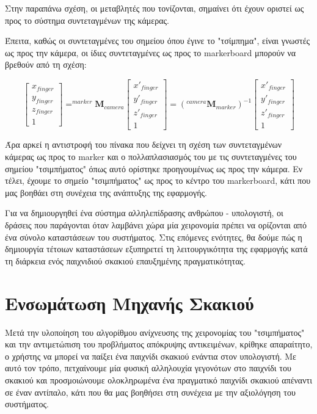 Στην παραπάνω σχέση, οι μεταβλητές που τονίζονται, σημαίνει ότι έχουν οριστεί ως προς το σύστημα συντεταγμένων της κάμερας.

Έπειτα, καθώς οι συντεταγμένες του σημείου όπου έγινε το "τσίμπημα", είναι γνωστές ως προς την κάμερα, οι ίδιες συντεταγμένες ως προς το markerboard μπορούν να βρεθούν από τη σχέση:


\begin{equation}
\begin{bmatrix}
x_{finger} \\ y_{finger} \\ z_{finger} \\ 1
\end{bmatrix}
=
^{marker}\mathbf{M}_{camera}
\begin{bmatrix}
x'_{finger} \\ y'_{finger} \\ z'_{finger} \\ 1
\end{bmatrix}
=
(^{camera}\mathbf{M}_{marker})^{-1}
\begin{bmatrix}
x'_{finger} \\ y'_{finger} \\ z'_{finger} \\ 1
\end{bmatrix}
\end{equation}


Άρα αρκεί η αντιστροφή του πίνακα που δείχνει τη σχέση των συντεταγμένων κάμερας ως προς το marker και ο πολλαπλασιασμός του με τις συντεταγμένες του σημείου "τσιμπήματος" όπως αυτό ορίστηκε προηγουμένως ως προς την κάμερα. Εν τέλει, έχουμε το σημείο "τσιμπήματος" ως προς το κέντρο του markerboard, κάτι που μας βοηθάει στη συνέχεια της ανάπτυξης της εφαρμογής.




Για να δημιουργηθεί ένα σύστημα αλληλεπίδρασης ανθρώπου - υπολογιστή, οι δράσεις που παράγονται όταν λαμβάνει χώρα μία χειρονομία πρέπει να ορίζονται από ένα σύνολο καταστάσεων του συστήματος. Στις επόμενες ενότητες, θα δούμε πώς η δημιουργία τέτοιων καταστάσεων εξυπηρετεί τη λειτουργικότητα της εφαρμογής κατά τη διάρκεια ενός παιχνιδιού σκακιού επαυξημένης πραγματικότητας.


\section{Ενσωμάτωση Μηχανής Σκακιού}

Μετά την υλοποίηση του αλγορίθμου ανίχνευσης της χειρονομίας του "τσιμπήματος" και την αντιμετώπιση του προβλήματος απόκρυψης αντικειμένων, κρίθηκε απαραίτητο, ο χρήστης να μπορεί να παίξει ένα παιχνίδι σκακιού ενάντια στον υπολογιστή. Με αυτό τον τρόπο, πετχαίνουμε μία φυσική αλληλουχία γεγονότων στο παιχνίδι του σκακιού και προσμοιώνουμε ολοκληρωμένα ένα πραγματικό παιχνίδι σκακιού απέναντι σε έναν αντίπαλο, κάτι που θα μας βοηθήσει στη συνέχεια με την αξιολόγηση του συστήματος. 


